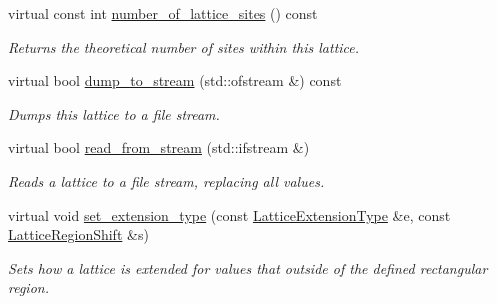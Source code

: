 \begin{DoxyCompactItemize}
virtual const int \hyperlink{classsisl_1_1cartesian__planar_a1c56e22aac7799696512deecef69fc2b}{number\+\_\+of\+\_\+lattice\+\_\+sites} () const
\begin{DoxyCompactList}\small\item\em Returns the theoretical number of sites within this lattice. \end{DoxyCompactList}\item 
\mbox{\label{classsisl_1_1cartesian__planar_a7870c4bc416767b53ef92812ef628523}} 
virtual bool \hyperlink{classsisl_1_1cartesian__planar_a7870c4bc416767b53ef92812ef628523}{dump\+\_\+to\+\_\+stream} (std\+::ofstream \&) const
\begin{DoxyCompactList}\small\item\em Dumps this lattice to a file stream. \end{DoxyCompactList}\item 
\mbox{\label{classsisl_1_1cartesian__planar_a683dc519e155eac540f1ef2bdd4f36fd}} 
virtual bool \hyperlink{classsisl_1_1cartesian__planar_a683dc519e155eac540f1ef2bdd4f36fd}{read\+\_\+from\+\_\+stream} (std\+::ifstream \&)
\begin{DoxyCompactList}\small\item\em Reads a lattice to a file stream, replacing all values. \end{DoxyCompactList}\item 
\mbox{\label{classsisl_1_1cartesian__planar_af8a148504e8c32b2582edfacd22247ed}} 
virtual void \hyperlink{classsisl_1_1cartesian__planar_af8a148504e8c32b2582edfacd22247ed}{set\+\_\+extension\+\_\+type} (const \hyperlink{namespacesisl_aaf1f41d23ed37dacaa4c9f1bb6d3324f}{Lattice\+Extension\+Type} \&e, const \hyperlink{namespacesisl_af139f6f74488292ae48c0d71eaa5d4f1}{Lattice\+Region\+Shift} \&s)
\begin{DoxyCompactList}\small\item\em Sets how a lattice is extended for values that outside of the defined rectangular region. \end{DoxyCompactList}\end{DoxyCompactItemize}
